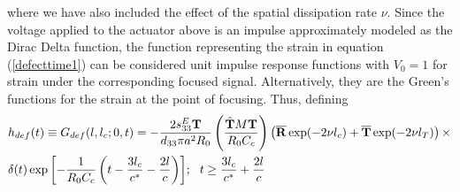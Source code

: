 \documentclass[11pt,letterpaper]{article}%
\begin{document}
where we have also included the effect of the spatial dissipation
rate $\nu$.  Since the voltage applied to the actuator above is an
impulse approximately modeled as the Dirac Delta function, the
function representing the strain in equation (\ref{defecttime1})
can be considered unit impulse response functions with $V_0 = 1$
for strain under the corresponding focused signal. Alternatively,
they are the Green's functions for the strain at the point of
focusing. Thus, defining
\begin{align}
&h_{def}(t) \equiv G_{def}(l,l_c; 0,t) = -\frac{2s^E_{33}{\bf
T}}{d_{33}\pi a^2R_0}\left(\frac{{\hat{\bf T}}M{\bf
T}}{R_0C_c}\right)\left(\overline{\bf R}\exp(-2\nu
l_c)+\overline{\bf
T}\exp(-2\nu l_T)\right)\times \nonumber\\
&\delta(t)\exp{\left[-\frac{1}{R_0C_c}\left(t-\frac{3l_c}{c^\ast}-\frac{2l}{c}\right)\right]};
\ \ t \geq \frac{3l_c}{c^\ast}+\frac{2l}{c} \label{impdefect}
\end{align}%

\end{document}

